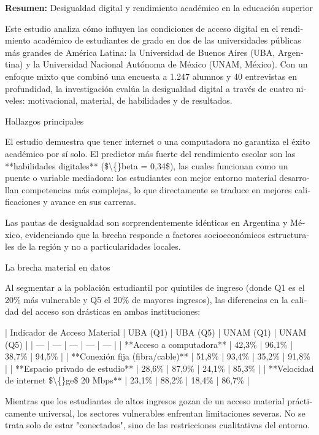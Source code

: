 \documentclass{article}
\begin{document}
\begin{tcolorbox}[colback=brown!8!white,colframe=brown!8!white,boxrule=0pt,arc=2pt,left=4pt,right=4pt,top=3pt,bottom=3pt,before skip=4pt,after skip=4pt]
\begin{otherlanguage}{spanish}
\sffamily\small \textbf{Resumen:} Desigualdad digital y rendimiento académico en la educación superior

Este estudio analiza cómo influyen las condiciones de acceso digital en el rendimiento académico de estudiantes de grado en dos de las universidades públicas más grandes de América Latina: la Universidad de Buenos Aires (UBA, Argentina) y la Universidad Nacional Autónoma de México (UNAM, México). Con un enfoque mixto que combinó una encuesta a 1.247 alumnos y 40 entrevistas en profundidad, la investigación evalúa la desigualdad digital a través de cuatro niveles: motivacional, material, de habilidades y de resultados.

Hallazgos principales

El estudio demuestra que tener internet o una computadora no garantiza el éxito académico por sí solo. El predictor más fuerte del rendimiento escolar son las **habilidades digitales** (\$\textbackslash\{\}beta = 0,34\$), las cuales funcionan como un puente o variable mediadora: los estudiantes con mejor entorno material desarrollan competencias más complejas, lo que directamente se traduce en mejores calificaciones y avance en sus carreras.

Las pautas de desigualdad son sorprendentemente idénticas en Argentina y México, evidenciando que la brecha responde a factores socioeconómicos estructurales de la región y no a particularidades locales.

La brecha material en datos

Al segmentar a la población estudiantil por quintiles de ingreso (donde Q1 es el 20\% más vulnerable y Q5 el 20\% de mayores ingresos), las diferencias en la calidad del acceso son drásticas en ambas instituciones:

| Indicador de Acceso Material | UBA (Q1) | UBA (Q5) | UNAM (Q1) | UNAM (Q5) |
| --- | --- | --- | --- | --- |
| **Acceso a computadora** | 42,3\% | 96,1\% | 38,7\% | 94,5\% |
| **Conexión fija (fibra/cable)** | 51,8\% | 93,4\% | 35,2\% | 91,8\% |
| **Espacio privado de estudio** | 28,6\% | 87,9\% | 24,1\% | 85,3\% |
| **Velocidad de internet \$\textbackslash\{\}ge\$ 20 Mbps** | 23,1\% | 88,2\% | 18,4\% | 86,7\% |

Mientras que los estudiantes de altos ingresos gozan de un acceso material prácticamente universal, los sectores vulnerables enfrentan limitaciones severas. No se trata solo de estar "conectados", sino de las restricciones cualitativas del entorno.


\end{otherlanguage}
\end{tcolorbox}
\end{document}
